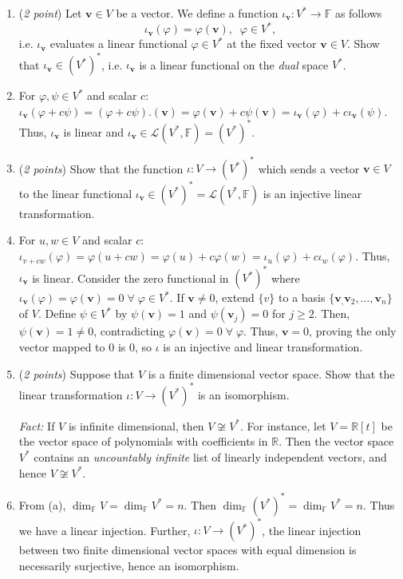 \documentclass[11pt]{article}
\newcommand{\bbF}{\mathbb{F}}
\newcommand{\bbR}{\mathbb{R}}
\renewcommand{\phi}{\varphi}
\theoremstyle{definition}
\numberwithin{equation}{subsection}
\begin{document}
\begin{enumerate}
\begin{enumerate}
\item (\emph{2 point}) Let $\mathbf{v} \in V$ be a vector. We define a function $\iota_{\mathbf{v}} \colon V^* \to \bbF$ as follows
$$\iota_{\mathbf{v}}(\phi) = \phi(\mathbf{v}), \;\; \phi\in V^*,$$
i.e. $\iota_{\mathbf{v}}$ evaluates a linear functional $\phi \in V^*$ at the fixed vector $\mathbf{v}\in V$. Show that $\iota_\mathbf{v} \in (V^*)^*$, i.e. $\iota_\mathbf{v}$ is a linear functional on the \emph{dual} space $V^*$.
\item[] For $\phi, \psi\in V^*$ and scalar $c$: $\iota_\mathbf{v}(\phi+c\psi)=(\phi+c\psi).(\mathbf{v})=\phi(\mathbf{v})+c\psi(\mathbf{v})=\iota_\mathbf{v}(\phi)+c\iota_\mathbf{v}(\psi)$. Thus, $\iota_\mathbf{v}$ is linear and $\iota_\mathbf{v}\in\mathcal{L}(V^*,\bbF)=(V^*)^*$.

\item (\emph{2 points}) Show that the function $\iota \colon V\to (V^*)^*$ which sends a vector $\mathbf{v}\in V$ to the linear functional $\iota_\mathbf{v}\in (V^*)^*=\mathcal{L}(V^*, \mathbb{F})$ is an injective linear transformation.
\item[] For $u,w\in V$ and scalar $c$: $\iota_{v+cw}(\phi)=\phi(u+cw)=\phi(u)+c\phi(w)=\iota_u(\phi)+c\iota_{w}(\phi)$. Thus, $\iota_\mathbf{v}$ is linear. Consider the zero functional in $(V^*)^*$ where $\iota_\mathbf{v}(\phi)=\phi(\mathbf{v})=0\; \forall\; \phi\in V^*$. If $\mathbf{v}\neq0$, extend $\{v\}$ to a basis $\{\mathbf{v}_,\mathbf{v}_2,\ldots,\mathbf{v}_n\}$ of $V$. Define $\psi\in V^*$ by $\psi(\mathbf{v})=1$ and $\psi(\mathbf{v}_j)=0$ for $j\geq 2$. Then, $\psi(\mathbf{v})=1\neq0$, contradicting $\phi(\mathbf{v})=0\;\forall\;\phi$. Thus, $\mathbf{v}=0$, proving the only vector mapped to 0 is 0, so $\iota$ is an injective and linear transformation.

\item (\emph{2 points}) Suppose that $V$ is a finite dimensional vector space. Show that the linear transformation $\iota \colon V \to (V^*)^*$ is an isomorphism. 

{\it Fact: }If $V$ is infinite dimensional, then $V\not\cong V^*$. For instance, let $V=\bbR[t]$ be the vector space of polynomials with coefficients in $\mathbb{R}$. Then the vector space $V^*$ contains an \emph{uncountably infinite} list of linearly independent vectors, and hence $V\not\cong V^*$.
\item[] From (a), $\dim_\bbF V=\dim_\bbF V^*=n$. Then $\dim_\bbF (V^*)^*=\dim_\bbF V^*=n$. Thus we have a linear injection. Further, $\iota:V\to (V^*)^*$, the linear injection between two finite dimensional vector spaces with equal dimension is necessarily surjective, hence an isomorphism.


\end{enumerate}
\end{enumerate}
\end{document}
